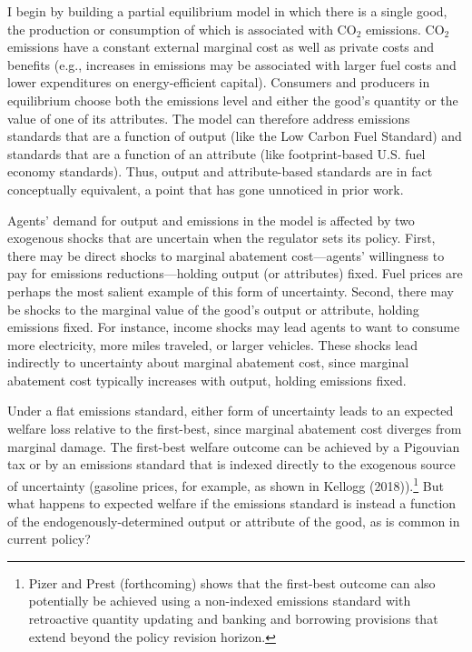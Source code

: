 \documentclass[12pt]{article}
\begin{document}
I begin by building a partial equilibrium model in which there is a single good, the production or consumption of which is associated with CO$_{\text{2}}$ emissions. CO$_{\text{2}}$ emissions have a constant external marginal cost as well as private costs and benefits (e.g., increases in emissions may be associated with larger fuel costs and lower expenditures on energy-efficient capital). Consumers and producers in equilibrium choose both the emissions level and either the good's quantity or the value of one of its attributes. The model can therefore address emissions standards that are a function of output (like the Low Carbon Fuel Standard) and standards that are a function of an attribute (like footprint-based U.S. fuel economy standards). Thus, output and attribute-based standards are in fact conceptually equivalent, a point that has gone unnoticed in prior work.

Agents' demand for output and emissions in the model is affected by two exogenous shocks that are uncertain when the regulator sets its policy. First, there may be direct shocks to marginal abatement cost---agents' willingness to pay for emissions reductions---holding output (or attributes) fixed. Fuel prices are perhaps the most salient example of this form of uncertainty. Second, there may be shocks to the marginal value of the good's output or attribute, holding emissions fixed. For instance, income shocks may lead agents to want to consume more electricity, more miles traveled, or larger vehicles. These shocks lead indirectly to uncertainty about marginal abatement cost, since marginal abatement cost typically increases with output, holding emissions fixed.

Under a flat emissions standard, either form of uncertainty leads to an expected welfare loss relative to the first-best, since marginal abatement cost diverges from marginal damage. The first-best welfare outcome can be achieved by a Pigouvian tax or by an emissions standard that is indexed directly to the exogenous source of uncertainty (gasoline prices, for example, as shown in Kellogg (2018)).\footnote{Pizer and Prest (forthcoming) shows that the first-best outcome can also potentially be achieved using a non-indexed emissions standard with retroactive quantity updating and banking and borrowing provisions that extend beyond the policy revision horizon.} But what happens to expected welfare if the emissions standard is instead a function of the endogenously-determined output or attribute of the good, as is common in current policy?
\end{document}
